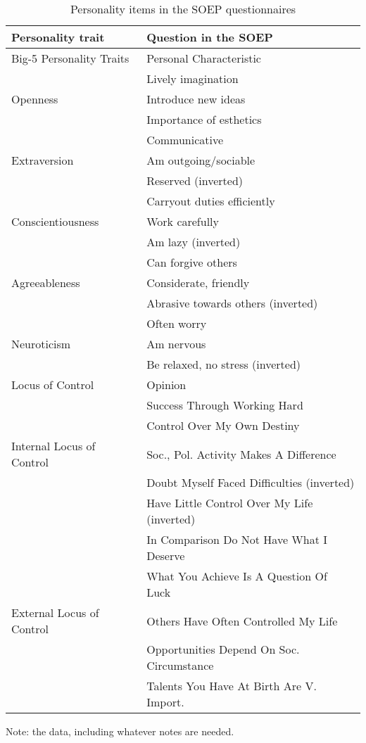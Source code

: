 \documentclass[%
    a4paper,            %
    11pt,               %
    bibliography=totoc, %
]
{scrartcl}
\begin{document}
\begin{table}[htp!]
	\small
	\centering
	\begin{threeparttable}
		\caption{Personality items in the SOEP questionnaires}
		\begin{tabular}{@{}ll@{}}
			\toprule
			Personality trait & Question in the SOEP \\ \midrule
			Big-5 Personality Traits & Personal Characteristic \\ \midrule
			& Lively imagination \\
			Openness & Introduce new ideas \\
			& Importance of esthetics \\ \midrule
			& Communicative \\
			Extraversion & Am outgoing/sociable \\
			& Reserved (inverted) \\ \midrule
			& Carryout duties efficiently \\
			Conscientiousness & Work carefully \\
			& Am lazy (inverted) \\ \midrule
			& Can forgive others \\
			Agreeableness & Considerate, friendly \\
			& Abrasive towards others (inverted) \\ \midrule
			& Often worry \\ 
			Neuroticism & Am nervous \\
			& Be relaxed, no stress (inverted) \\ \midrule
			Locus of Control & Opinion \\ \midrule
			& Success Through Working Hard \\
			& Control Over My Own Destiny \\
			Internal Locus of Control & Soc., Pol. Activity Makes A Difference \\
			& Doubt Myself Faced Difficulties (inverted) \\
			& Have Little Control Over My Life (inverted) \\ \midrule
			& In Comparison Do Not Have What I Deserve \\
			& What You Achieve Is A Question Of Luck \\
			External Locus of Control & Others Have Often Controlled My Life \\
			& Opportunities Depend On Soc. Circumstance \\
			& Talents You Have At Birth Are V. Import. \\ \bottomrule
		\end{tabular}
		\begin{tablenotes}[flushleft]
			\footnotesize
			\item 
			Note:
			the data, including whatever notes are needed.
		\end{tablenotes}
	\end{threeparttable}
\end{table}



\pagebreak
\nocite{*}
\end{document}
